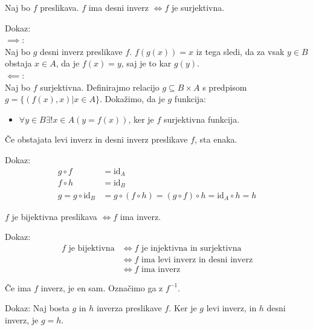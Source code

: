\begin{trditev}
    Naj bo $f$ preslikava.
    $f$ ima desni inverz $\iff f$ je surjektivna.
\end{trditev}
Dokaz: \\
$\implies$: \\
Naj bo $g$ desni inverz preslikave $f$.
$f(g(x)) = x$ iz tega sledi, da za vsak $y \in B$ obstaja $x \in A$, da je $f(x) = y$, saj je to kar $g(y)$. \\

$\impliedby$: \\
Naj bo $f$ surjektivna.
Definirajmo relacijo $g \subseteq B \times A$ s predpisom $g = \{(f(x), x) | x \in A\}$.
Dokažimo, da je $g$ funkcija:
\begin{itemize}
    \item $\forall y \in B \exists! x \in A(y = f(x))$, ker je $f$ surjektivna funkcija.
\end{itemize}

\begin{trditev}
    Če obstajata levi inverz in desni inverz preslikave $f$, sta enaka.
\end{trditev}
Dokaz:
\begin{align*}
    g \circ f &= \text{id}_A \\
    f \circ h &= \text{id}_B \\
    g = g \circ \text{id}_B &= g \circ (f \circ h) = (g \circ f) \circ h = \text{id}_A \circ h = h
\end{align*}

\begin{trditev}
    $f$ je bijektivna preslikava $\iff f$ ima inverz.
\end{trditev}
Dokaz:
\begin{align*}
    f \text{ je bijektivna} &\iff f \text{ je injektivna in surjektivna} \\
    &\iff f \text{ ima levi inverz in desni inverz} \\
    &\iff f \text{ ima inverz}
\end{align*}

\begin{trditev}
    Če ima $f$ inverz, je en sam.
    Označimo ga z $f^{-1}$.
\end{trditev}
Dokaz:
Naj bosta $g$ in $h$ inverza preslikave $f$.
Ker je $g$ levi inverz, in $h$ desni inverz, je $g = h$.



